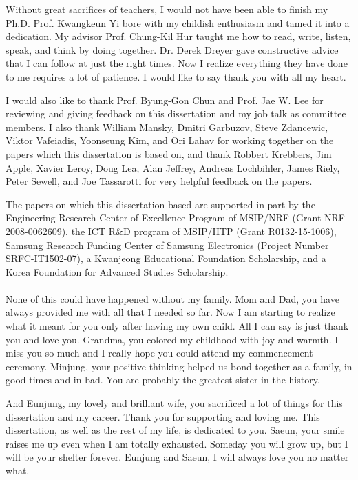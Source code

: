 \acknowledgement

Without great sacrifices of teachers, I would not have been able to finish my Ph.D.  Prof. Kwangkeun
Yi bore with my childish enthusiasm and tamed it into a dedication.  My advisor Prof. Chung-Kil Hur
taught me how to read, write, listen, speak, and think by doing together.  Dr. Derek Dreyer gave
constructive advice that I can follow at just the right times.  Now I realize everything they have
done to me requires a lot of patience.  I would like to say thank you with all my heart.

I would also like to thank Prof. Byung-Gon Chun and Prof. Jae W. Lee for reviewing and giving
feedback on this dissertation and my job talk as committee members.  I also thank William Mansky,
Dmitri Garbuzov, Steve Zdancewic, Viktor Vafeiadis, Yoonseung Kim, and Ori Lahav for working
together on the papers which this dissertation is based on, and thank Robbert Krebbers, Jim Apple,
Xavier Leroy, Doug Lea, Alan Jeffrey, Andreas Lochbihler, James Riely, Peter Sewell, and Joe
Tassarotti for very helpful feedback on the papers.

The papers on which this dissertation based are supported in part by the Engineering Research Center
of Excellence Program of MSIP/NRF (Grant NRF-2008-0062609), the ICT R\&D program of MSIP/IITP (Grant
R0132-15-1006), Samsung Research Funding Center of Samsung Electronics (Project Number
SRFC-IT1502-07), a Kwanjeong Educational Foundation Scholarship, and a Korea Foundation for Advanced
Studies Scholarship.


\paragraph*{}

None of this could have happened without my family.  Mom and Dad, you have always provided me with
all that I needed so far.  Now I am starting to realize what it meant for you only after having my
own child.  All I can say is just thank you and love you.  Grandma, you colored my childhood with
joy and warmth.  I miss you so much and I really hope you could attend my commencement ceremony.
Minjung, your positive thinking helped us bond together as a family, in good times and in bad.  You
are probably the greatest sister in the history.

And Eunjung, my lovely and brilliant wife, you sacrificed a lot of things for this dissertation and
my career.  Thank you for supporting and loving me.  This dissertation, as well as the rest of my
life, is dedicated to you.  Saeun, your smile raises me up even when I am totally exhausted.
Someday you will grow up, but I will be your shelter forever.  Eunjung and Saeun, I will always love
you no matter what.



